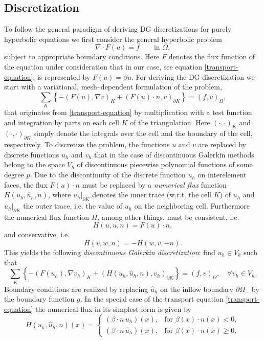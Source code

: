 \documentclass[11pt]{article}
\begin{document}
\subsection{Discretization}
To follow the general paradigm of deriving DG discretizations for purely
hyperbolic equations we first consider the general hyperbolic problem
\[
  \nabla\cdot F(u)=f  \qquad\mbox{in }\Omega,
\]
subject to appropriate boundary conditions. Here $F$ denotes the flux
function of the equation under consideration that in our case, see
equation \eqref{transport-equation}, is represented by $F(u)=\beta u$.
For deriving the DG discretization we start with a variational,
mesh--dependent formulation of the problem,
\[
  \sum_K\left\{-(F(u),\nabla v)_K+(F(u)\cdot n, v)_{\partial K}\right\}=(f,v)_\Omega,
\]
that originates from \eqref{transport-equation} by multiplication with
a test function and integration by parts on each cell $K$ of the
triangulation. Here $(\cdot, \cdot)_K$ and $(\cdot, \cdot)_{\partial
  K}$ simply denote the integrals over the cell and the boundary of
the cell, respectively. To discretize the problem, the functions $u$ 
and $v$ are replaced by discrete functions $u_h$ and $v_h$ that in the
case of discontinuous Galerkin methods belong to the space $V_h$ of
discontinuous piecewise polynomial functions of some degree $p$. Due
to the discontinuity of the discrete function $u_h$ on interelement
faces, the flux $F(u)\cdot n$ must be replaced by a \emph{numerical
  flux} function $H(u_h, \hat u_h, n)$, where $u_h|_{\partial K}$
denotes the inner trace (w.r.t.  the cell $K$) of $u_h$ and $\hat
u_h|_{\partial K}$ the outer trace, i.e. the value of $u_h$ on the
neighboring cell. Furthermore the numerical flux function $H$, among
other things, must be consistent, i.e.
\[
H(u,u,n)=F(u)\cdot n,
\]
and conservative, i.e.
\begin{equation}\label{conservative}
H(v,w,n)=-H(w,v,-n).
\end{equation}
This yields the following \emph{discontinuous Galerkin
  discretization}: find $u_h\in V_h$ such that
\begin{equation}\label{dg-scheme}
  \sum_K\left\{-(F(u_h),\nabla v_h)_K+(H(u_h,\hat u_h,n), v_h)_{\partial K}\right\}=(f,v)_\Omega, \quad\forall v_h\in V_h.
\end{equation}
Boundary conditions are realized by replacing $\hat u_h$ on the inflow boundary $\partial\Omega_-$ by the boundary function $g$.
In the special case of the transport equation
\eqref{transport-equation} the numerical flux in its simplest form
is given by
\begin{equation}\label{flux-transport-equation}
  H(u_h,\hat u_h,n)(x)=\left\{\begin{array}{ll}
      (\beta\cdot n\, u_h)(x),&\mbox{for } \beta(x)\cdot n(x)<0,\\
      (\beta\cdot n\, \hat u_h)(x),&\mbox{for } \beta(x)\cdot n(x)\geq 0,
\end{array}
\right.
\end{equation}
\end{document}
